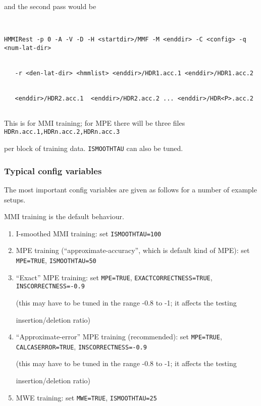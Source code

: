 and the second pass would be


\begin{verbatim}


HMMIRest -p 0 -A -V -D -H <startdir>/MMF -M <enddir> -C <config> -q <num-lat-dir> 


   -r <den-lat-dir> <hmmlist> <enddir>/HDR1.acc.1 <enddir>/HDR1.acc.2 


   <enddir>/HDR2.acc.1  <enddir>/HDR2.acc.2 ... <enddir>/HDR<P>.acc.2 


\end{verbatim}


This is for MMI training; for MPE there will be three files \texttt{HDRn.acc.1,HDRn.acc.2,HDRn.acc.3}


per block of training data.  \texttt{ISMOOTHTAU} can also be tuned.





\subsubsection{Typical config variables}





The most important config variables are given as follows for a number of example setups.


MMI training is the default behaviour.


\begin{enumerate}  


   \item I-smoothed MMI training: set \texttt{ISMOOTHTAU=100}


   \item MPE training (``approximate-accuracy'', which is default kind of MPE): set \texttt{MPE=TRUE}, \texttt{ISMOOTHTAU=50}


   \item ``Exact'' MPE training: set \texttt{MPE=TRUE}, \texttt{EXACTCORRECTNESS=TRUE}, \texttt{INSCORRECTNESS=-0.9}


        (this  may have to be tuned in the range -0.8 to -1; it affects the testing 


        insertion/deletion ratio)


   \item ``Approximate-error'' MPE training (recommended): set \texttt{MPE=TRUE}, \texttt{CALCASERROR=TRUE}, \texttt{INSCORRECTNESS=-0.9}


        (this  may have to be tuned in the range -0.8 to -1; it affects the testing 


        insertion/deletion ratio)


   \item MWE training: set \texttt{MWE=TRUE}, \texttt{ISMOOTHTAU=25}


\end{enumerate}





